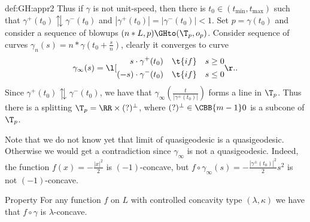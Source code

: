 {\begin{subthm}{def:GH:appr2}
Thus if $\gamma$ is not unit-speed, then there is $t_0\in(t_{\min},t_{\max})$ such that $\gamma^+(t_0)\updownarrows\gamma^-(t_0)$ and $|\gamma^+(t_0)|=|\gamma^-(t_0)|<1$.
Set $p=\gamma(t_0)$ and consider a sequence of blowups $(n*L,p)\GHto(\T_p,o_p)$.
Consider sequence of curves $\gamma_n(s)=n*\gamma(t_0+\tfrac s n)$, clearly it converges to curve
$$\gamma_\infty(s)=\l[
\begin{aligned}
s&\cdot\gamma^+(t_0)&\t{if}& &s&\ge0\\
(-s)&\cdot\gamma^-(t_0)&\t{if}& &s&\le0
\end{aligned}
\r.
.$$
Since $\gamma^+(t_0)\updownarrows\gamma^-(t_0)$, we have that $\gamma_\infty(\tfrac t{|\gamma^\pm(t_0)|})$ forms a line in $\T_p$.
Thus there is a splitting $\T_p=\RR\times(?)^\perp$, where $(?)^\perp\in\CBB{m-1}0$ is a subcone of $\T_p$.

 Note that we do not know yet that limit of quasigeodesic is a quasigeodesic.
Otherwise we would get a contradiction since $\gamma_\infty$ is not a quasigeodesic.
Indeed, the function $f(x)=-\tfrac{|x|^2}{2}$ is $(-1)$-concave, but $f\circ\gamma_\infty(s)=-\tfrac{|\gamma^\pm(t_0)|^2}{2}s^2$
is not $(-1)$-concave.














\begin{thm}{Property}\label{propr:weak-qg}
For any function $f$ on $L$ with controlled concavity type $(\lambda,\kappa)$ we
have that $f\circ\gamma$ is $\lambda$-concave.
\end{thm}


\end{subthm}}
